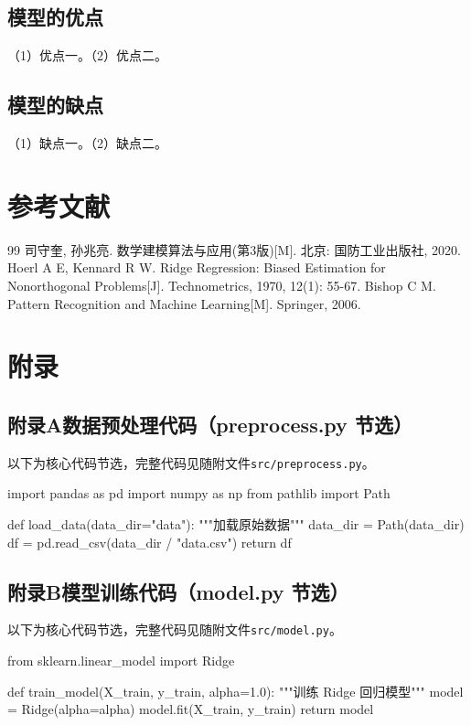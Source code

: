 \documentclass[12pt,a4paper]{article}
\begin{document}
\subsection{模型的优点}

（1）优点一。（2）优点二。

\subsection{模型的缺点}

（1）缺点一。（2）缺点二。

\clearpage
\section{参考文献}

\begin{thebibliography}{99}
\setlength{\itemsep}{2pt}
\setlength{\topsep}{0pt}
\setlength{\labelsep}{0.5em}
 司守奎, 孙兆亮. 数学建模算法与应用(第3版)[M]. 北京: 国防工业出版社, 2020.
 Hoerl A E, Kennard R W. Ridge Regression: Biased Estimation for Nonorthogonal Problems[J]. Technometrics, 1970, 12(1): 55-67.
 Bishop C M. Pattern Recognition and Machine Learning[M]. Springer, 2006.
\end{thebibliography}

\clearpage
\section{附录}

\subsection*{附录A\quad 数据预处理代码（preprocess.py 节选）}

以下为核心代码节选，完整代码见随附文件\texttt{src/preprocess.py}。

\begin{pycode}
import pandas as pd
import numpy as np
from pathlib import Path

def load_data(data_dir="data"):
    """加载原始数据"""
    data_dir = Path(data_dir)
    df = pd.read_csv(data_dir / "data.csv")
    return df
\end{pycode}

\subsection*{附录B\quad 模型训练代码（model.py 节选）}

以下为核心代码节选，完整代码见随附文件\texttt{src/model.py}。

\begin{pycode}
from sklearn.linear_model import Ridge

def train_model(X_train, y_train, alpha=1.0):
    """训练 Ridge 回归模型"""
    model = Ridge(alpha=alpha)
    model.fit(X_train, y_train)
    return model
\end{pycode}
\end{document}
